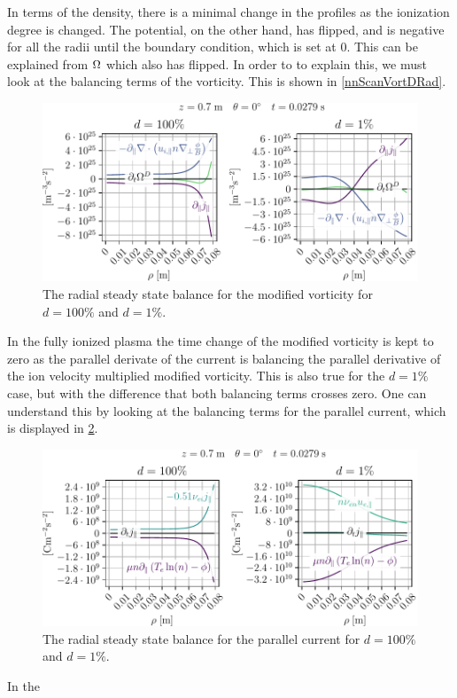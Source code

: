%
In terms of the density, there is a minimal change in the profiles as the ionization degree is changed.
The potential, on the other hand, has flipped, and is negative for all the radii until the boundary condition, which is set at $0$.
This can be explained from $\Omega$ which also has flipped.
In order to to explain this, we must look at the balancing terms of the vorticity.
This is shown in \cref{nnScanVortDRad}.
%
\begin{figure}[htb]
    \centering
    \includegraphics{fig/results/neutral/vortDBalanceNnCompareRad}
    \caption{The radial steady state balance for the modified vorticity for $d=100\%$ and $d=1\%$.}
    \label{fig:nnScanVortDRad}
\end{figure}
%
In the fully ionized plasma the time change of the modified vorticity is kept to zero as the parallel derivate of the current is balancing the parallel derivative of the ion velocity multiplied modified vorticity.
This is also true for the $d=1\%$ case, but with the difference that both balancing terms crosses zero.
One can understand this by looking at the balancing terms for the parallel current, which is displayed in \cref{fig:nnScanJParRad}.
%
\begin{figure}[htb]
    \centering
    \includegraphics{fig/results/neutral/jParBalanceNnCompareRad}
    \caption{The radial steady state balance for the parallel current for $d=100\%$ and $d=1\%$.}
    \label{fig:nnScanJParRad}
\end{figure}
%
In the









